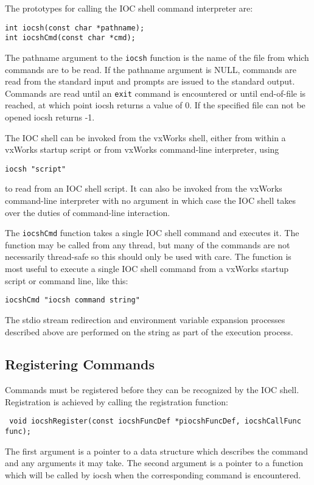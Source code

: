 The prototypes for calling the IOC shell command interpreter are:

\begin{verbatim}int iocsh(const char *pathname);
int iocshCmd(const char *cmd);
\end{verbatim}
The pathname argument to the \verb|iocsh| function is the name of the file from which commands are to be read.  If the 
pathname argument is NULL, commands are read from the standard input and prompts are issued to the standard output.  
Commands are read until an \verb|exit| command is encountered or until end-of-file is reached, at which point iocsh returns a 
value of 0.  If the specified file can not be opened iocsh returns -1.

The IOC shell can be invoked from  the vxWorks shell, either from within a vxWorks startup script or from vxWorks 
command-line interpreter, using

\begin{verbatim}iocsh "script"
\end{verbatim}to read from an IOC shell script.  It can also be invoked from the vxWorks command-line interpreter with no argument in 
which case the IOC shell takes over the duties of command-line interaction.

The \verb|iocshCmd| function takes a single IOC shell command and executes it. The function may be called from any thread, 
but many of the commands are not necessarily thread-safe so this should only be used with care. The function is most 
useful to execute a single IOC shell command from a vxWorks startup script or command line, like this:

\begin{verbatim}iocshCmd "iocsh command string"
\end{verbatim}The stdio stream redirection and environment variable expansion processes described above are performed on the string 
as part of the execution process.

\subsection{Registering Commands}

Commands must be registered before they can be recognized by the IOC shell.  Registration is achieved by calling  the 
registration function:

\begin{verbatim} void iocshRegister(const iocshFuncDef *piocshFuncDef, iocshCallFunc func);
\end{verbatim}The first argument is a pointer to a data structure which describes the command and any arguments it may take.  The 
second argument is a pointer to a function which will be called by iocsh when the corresponding command is 
encountered.

